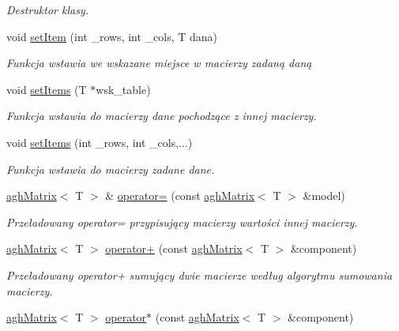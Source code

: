 \begin{DoxyCompactItemize}
\begin{DoxyCompactList}\small\item\em \-Destruktor klasy. \end{DoxyCompactList}\item 
void \hyperlink{classaghMatrix_ae7991d6754d3ed3d049818db3062654e}{set\-Item} (int \-\_\-rows, int \-\_\-cols, \-T dana)
\begin{DoxyCompactList}\small\item\em \-Funkcja wstawia we wskazane miejsce w macierzy zadaną daną \end{DoxyCompactList}\item 
void \hyperlink{classaghMatrix_a5fc4e1b14fd466783974302690a8d976}{set\-Items} (\-T $\ast$wsk\-\_\-table)
\begin{DoxyCompactList}\small\item\em \-Funkcja wstawia do macierzy dane pochodzące z innej macierzy. \end{DoxyCompactList}\item 
void \hyperlink{classaghMatrix_a480f9e59b5f2aeb65211c695f4dc9b31}{set\-Items} (int \-\_\-rows, int \-\_\-cols,...)
\begin{DoxyCompactList}\small\item\em \-Funkcja wstawia do macierzy zadane dane. \end{DoxyCompactList}\item 
\hyperlink{classaghMatrix}{agh\-Matrix}$<$ \-T $>$ \& \hyperlink{classaghMatrix_a06703f7fa0be5ea835c6e2cef1215b71}{operator=} (const \hyperlink{classaghMatrix}{agh\-Matrix}$<$ \-T $>$ \&model)
\begin{DoxyCompactList}\small\item\em \-Przeładowany operator= przypisujący macierzy wartości innej macierzy. \end{DoxyCompactList}\item 
\hyperlink{classaghMatrix}{agh\-Matrix}$<$ \-T $>$ \hyperlink{classaghMatrix_a3ba469b2e1cc867b147550944a407c13}{operator+} (const \hyperlink{classaghMatrix}{agh\-Matrix}$<$ \-T $>$ \&component)
\begin{DoxyCompactList}\small\item\em \-Przeładowany operator+ sumujący dwie macierze według algorytmu sumowania macierzy. \end{DoxyCompactList}\item 
\hyperlink{classaghMatrix}{agh\-Matrix}$<$ \-T $>$ \hyperlink{classaghMatrix_ac967f4a15f0154eecf7b372fd1c7c166}{operator$\ast$} (const \hyperlink{classaghMatrix}{agh\-Matrix}$<$ \-T $>$ \&component)

\end{DoxyCompactItemize}

